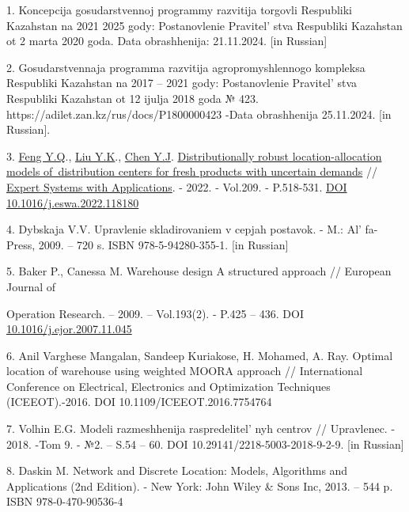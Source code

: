 \begin{references}
1. Koncepcija gosudarstvennoj programmy razvitija torgovli Respubliki
Kazahstan na 2021
2025 gody: Postanovlenie Pravitel' stva Respubliki
Kazahstan ot 2 marta 2020 goda.
\href{https://www.gov.kz/memleket/entities/mti/documents/details/61426?lang=ru-}{}
Data obrashhenija: 21.11.2024. {[}in Russian{]}

2. Gosudarstvennaja programma razvitija agropromyshlennogo kompleksa
Respubliki Kazahstan
na 2017 -- 2021 gody: Postanovlenie Pravitel' stva
Respubliki Kazahstan ot 12 ijulja 2018 goda № 423.
https://adilet.zan.kz/rus/docs/P1800000423 -Data obrashhenija
25.11.2024. {[}in Russian{]}.

3. \href{https://www.webofscience.com/wos/author/record/34864370}{Feng
Y.Q}.,
\href{https://www.webofscience.com/wos/author/record/33997583}{Liu
Y.K}.,
\href{https://www.webofscience.com/wos/author/record/34807908}{Chen
Y.J}.
\href{https://www.webofscience.com/wos/woscc/full-record/WOS:000859686100002}{Distributionally
robust location-allocation models of~distribution centers for fresh
products with uncertain demands} //
\href{https://www.sciencedirect.com/journal/expert-systems-with-applications}{Expert
Systems with Applications}. - 2022. - Vol.209. - P.518-531.
\href{https://doi.org/10.1016/j.eswa.2022.118180}{DOI
10.1016/j.eswa.2022.118180}

4. Dybskaja V.V. Upravlenie skladirovaniem v cepjah postavok. - M.:
Al' fa-Press, 2009. -- 720 s. ISBN 978-5-94280-355-1.
{[}in Russian{]}

5. Baker P., Canessa M. Warehouse design A structured approach //
European Journal of

Operation Research. -- 2009. -- Vol.193(2). - P.425 -- 436. DOI
\href{http://dx.doi.org/10.1016/j.ejor.2007.11.045}{10.1016/j.ejor.2007.11.045}

6. Anil Varghese Mangalan, Sandeep Kuriakose, H. Mohamed, A. Ray. Optimal
location of warehouse using weighted MOORA approach // International
Conference on Electrical, Electronics and Optimization Techniques
(ICEEOT).-2016. DOI 10.1109/ICEEOT.2016.7754764

7. Volhin E.G. Modeli razmeshhenija raspredelitel' nyh
centrov // Upravlenec. - 2018. -Tom 9. - №2. -- S.54 -- 60. DOI
10.29141/2218-5003-2018-9-2-9. {[}in Russian{]}

8. Daskin M. Network and Discrete Location: Models, Algorithms and
Applications (2nd Edition). - New York: John Wiley \& Sons Inc, 2013. --
544 p. ISBN 978-0-470-90536-4


\end{references}
